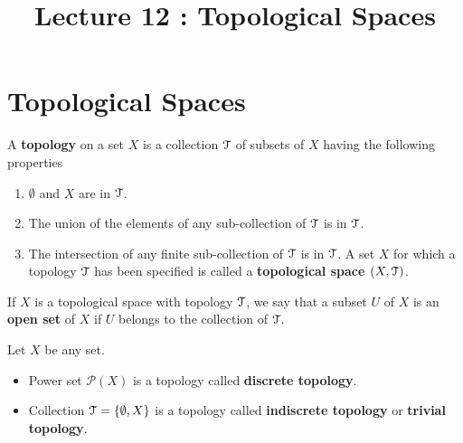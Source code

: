 \documentclass[a4paper,english,12pt]{article}   	%
\title{Lecture 12 : Topological Spaces}
\author{}
\begin{document}
\maketitle
\section{Topological Spaces}
\begin{defn} A \textbf{topology} on a set $X$ is a collection $\mathcal{T}$ of subsets of $X$ having the following properties
\begin{enumerate}
\item $\emptyset$ and $X$ are in $\mathcal{T}$.
\item The union of the elements of any sub-collection of $\mathcal{T}$ is in $\mathcal{T}$.
\item The intersection of any finite sub-collection of $\mathcal{T}$ is in $\mathcal{T}$. A set $X$ for which a topology $\mathcal{T}$ has been specified is called a \textbf{topological space $(X,\mathcal{T})$}.
\end{enumerate}
\end{defn}
\begin{defn} If $X$ is a topological space with topology $\mathcal{T}$, we say that a subset $U$ of $X$ is an \textbf{open set} of $X$ if $U$ belongs to the collection of $\mathcal{T}$.
\end{defn}
\begin{defn} Let $X$ be any set. 
\begin{itemize}
	\item Power set $\mathcal{P}(X)$ is a topology called \textbf{discrete topology}.
	\item Collection $\mathcal{T} =\{\emptyset,X\}$ is a topology called \textbf{indiscrete topology} or \textbf{trivial topology}.
\end{itemize} 
\end{defn}
\end{document}
